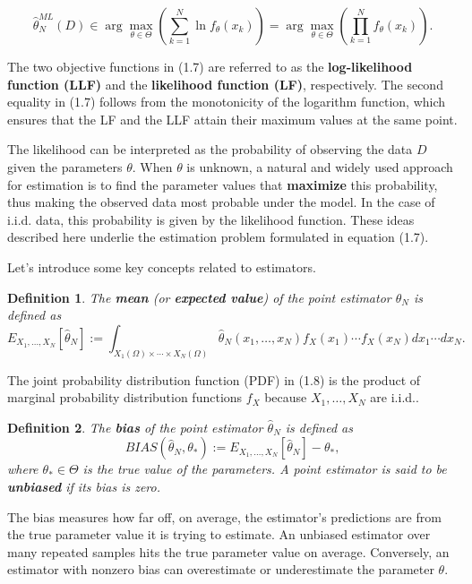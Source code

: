 \documentclass{report}
\newtheorem{definition}{Definition}[chapter]
\begin{document}
\begin{equation}
\hat{\theta}^{ML}_N(D) \in \arg \max_{\theta \in \Theta} \left(\sum_{k=1}^N \ln f_\theta(x_k)\right) = \arg \max_{\theta \in \Theta} \left(\prod_{k=1}^N f_\theta(x_k) \right).
\end{equation}

The two objective functions in (1.7) are referred to as the \textbf{log-likelihood function (LLF)} and the \textbf{likelihood function (LF)}, respectively.
The second equality in (1.7) follows from the monotonicity of the logarithm function, which ensures that the LF and the LLF attain their maximum values at the same point.

The likelihood can be interpreted as the probability of observing the data $D$ given the parameters $\theta$. When $\theta$ is unknown, a natural and widely used approach for estimation is to find the parameter values that \textbf{maximize} this probability, thus making the observed data most probable under the model. In the case of i.i.d. data, this probability is given by the likelihood function. These ideas described here underlie the estimation problem formulated in equation (1.7).

Let’s introduce some key concepts related to estimators.
\begin{definition}
The \textbf{mean} (or \textbf{expected value}) of the point estimator $\hat{\theta}_N$ is defined as
\begin{equation}
E_{X_1,\dots,X_N}[\hat{\theta}_N] := \int_{X_1(\Omega)\times \cdots \times X_N(\Omega)} \hat{\theta}_N(x_1,\dots,x_N)f_X(x_1)\cdots f_X(x_N) dx_1\cdots dx_N.
\end{equation}
\end{definition}

The joint probability distribution function (PDF) in (1.8) is the product of marginal probability distribution functions $f_X$ because $X_1,\dots,X_N$ are i.i.d..

\begin{definition}
The \textbf{bias} of the point estimator $\hat{\theta}_N$ is defined as
\begin{equation}
BIAS(\hat{\theta}_N,\theta_*) := E_{X_1,\dots,X_N}[\hat{\theta}_N] - \theta_*,
\end{equation}
where $\theta_* \in \Theta$ is the true value of the parameters. A point estimator is said to be \textbf{unbiased} if its bias is zero.
\end{definition}

The bias measures how far off, on average, the estimator's predictions are from the true parameter value it is trying to estimate. An unbiased estimator over many repeated samples hits the true parameter value on average. Conversely, an estimator with nonzero bias can overestimate or underestimate the parameter $\theta$.
\end{document}
